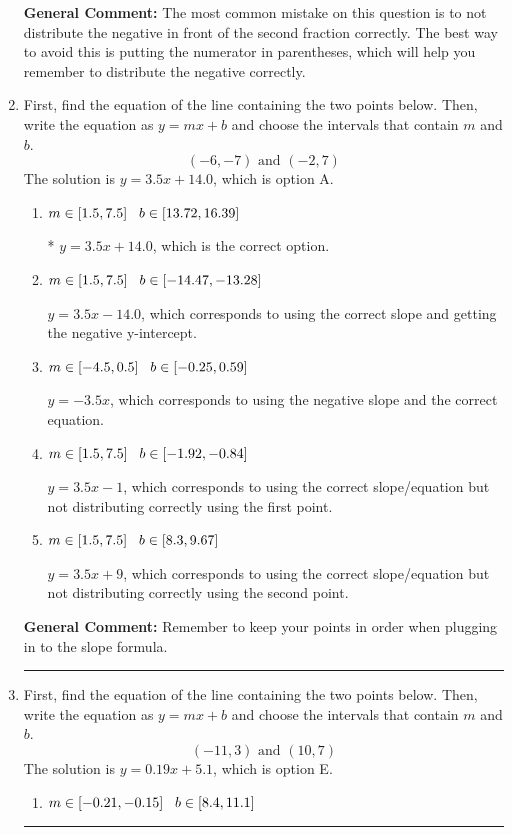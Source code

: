 \documentclass{extbook}[14pt]
\newcommand{\litem}[1]{\item #1

\rule{\textwidth}{0.4pt}}
\begin{document}
\begin{enumerate}
{\textbf{General Comment:} The most common mistake on this question is to not distribute the negative in front of the second fraction correctly. The best way to avoid this is putting the numerator in parentheses, which will help you remember to distribute the negative correctly.
}
\litem{
First, find the equation of the line containing the two points below. Then, write the equation as $ y=mx+b $ and choose the intervals that contain $m$ and $b$.
\[ (-6, -7) \text{ and } (-2, 7) \]The solution is \( y = 3.5x + 14.0 \), which is option A.\begin{enumerate}[label=\Alph*.]
\item \( m \in [1.5, 7.5] \hspace*{3mm} b \in [13.72, 16.39] \)

* $y = 3.5x + 14.0$, which is the correct option.
\item \( m \in [1.5, 7.5] \hspace*{3mm} b \in [-14.47, -13.28] \)

 $y = 3.5x -14.0$, which corresponds to using the correct slope and getting the negative y-intercept.
\item \( m \in [-4.5, 0.5] \hspace*{3mm} b \in [-0.25, 0.59] \)

 $y = -3.5x$, which corresponds to using the negative slope and the correct equation.
\item \( m \in [1.5, 7.5] \hspace*{3mm} b \in [-1.92, -0.84] \)

 $y = 3.5x -1$, which corresponds to using the correct slope/equation but not distributing correctly using the first point.
\item \( m \in [1.5, 7.5] \hspace*{3mm} b \in [8.3, 9.67] \)

 $y = 3.5x + 9$, which corresponds to using the correct slope/equation but not distributing correctly using the second point.
\end{enumerate}

\textbf{General Comment:} Remember to keep your points in order when plugging in to the slope formula.
}
\litem{
First, find the equation of the line containing the two points below. Then, write the equation as $ y=mx+b $ and choose the intervals that contain $m$ and $b$.
\[ (-11, 3) \text{ and } (10, 7) \]The solution is \( y = 0.19x + 5.1 \), which is option E.\begin{enumerate}[label=\Alph*.]
\item \( m \in [-0.21, -0.15] \hspace*{3mm} b \in [8.4, 11.1] \)


\end{enumerate}}
\end{enumerate}
\end{document}
